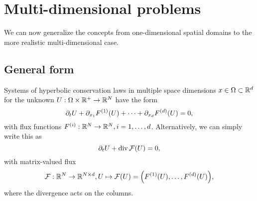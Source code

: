\section{Multi-dimensional problems}

We can now generalize the concepts from one-dimensional spatial domains to the more realistic multi-dimensional case.


\subsection{General form}

Systems of hyperbolic conservation laws in multiple space dimensions \(x \in \Omega \subset \R^d\) for the unknown \(U: \Omega \times \R^+ \to \R^N\) have the form
\[
	\partial_t U + \partial_{x_1}F^{\parentheses*{1}}\parentheses*{U} + \cdots + \partial_{x_d}F^{\parentheses*{d}}\parentheses*{U} = 0,
\]
with flux functions \(F^{\parentheses*{i}}: \R^N \to \R^N, i = 1, \ldots, d\).
Alternatively, we can simply write this as
\[
	\partial_t U + \div\mathcal{F}\parentheses*{U} = 0,
\]
with matrix-valued flux
\[
	\mathcal{F}: \R^N \to \R^{N \times d}, U \mapsto \mathcal{F}\parentheses*{U} = \parentheses*{F^{\parentheses*{1}}\parentheses*{U}, \ldots, F^{\parentheses*{d}}\parentheses*{U}},
\]
where the divergence acts on the columns.

